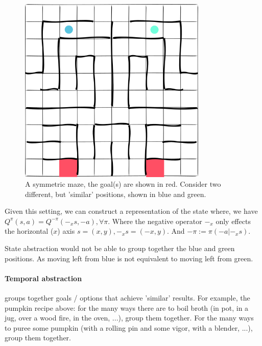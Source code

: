 \begin{figure}[h!]
\centering
\includegraphics[width=0.8\textwidth,height=0.4\textheight]{../../pictures/drawings/maze.png}
\caption{A symmetric maze, the goal(s) are shown in red.
Consider two different, but 'similar' positions, shown in blue and green.}
\end{figure}

Given this setting, we can construct a representation of the state \footnotemark[11] where,
we have $Q^{\pi}(s, a) = Q^{-\pi}(-_xs, -a), \forall \pi$.
Where the negative operator $-_x$ only effects the horizontal ($x$) axis $s = (x, y), -_xs = (-x, y)$.
And $-\pi := \pi(-a|-_xs)$. \footnotemark[21]



State abstraction would not be able to group together the blue and green positions.
As moving left from blue is not equivalent to moving left from green.

\paragraph{Temporal abstraction} groups together goals / options that achieve 'similar' results.
For example, the pumpkin recipe above: for the many ways there are to boil broth
(in pot, in a jug, over a wood fire, in the oven, ...), group them together.
For the many ways to puree some pumpkin (with a rolling pin and some vigor, with a blender, ...), group them together.

